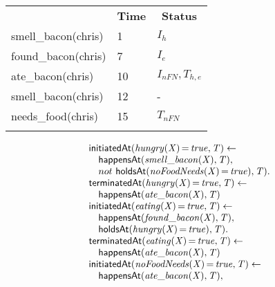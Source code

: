 \documentclass[8pt]{beamer}
\DeclareMathOperator{\val}{=}  %
\def \patsize {}
\def\happensAt{\textsf{\patsize happensAt}}
\def\holdsAt{\textsf{\patsize holdsAt}}
\def\initiatedAt{\textsf{\patsize initiatedAt}}
\def\terminatedAt{\textsf{\patsize terminatedAt}}
\newenvironment{mysplit}%
  {\arraycolsep 0pt \begin{array}{l}}%
  {\end{array}}
\begin{document}
\begin{frame}
\begin{minipage}{0.4\linewidth}
\begin{table}[t!]
\begin{center}
                \begin{tabular}{lll}
                    \hline\noalign{\smallskip}
                    \multicolumn{1}{l}{\textbf{Event}} & \multicolumn{1}{c}{\textbf{Time}} & \multicolumn{1}{c}{\textbf{Status}} \\
                    smell\_bacon(chris)& 1 & $I_{h}$\\
                    found\_bacon(chris)& 7 & $I_{e}$\\
                    ate\_bacon(chris)& 10  & $I_{nFN},T_{h,e}$\\
                    smell\_bacon(chris)& 12 & -\\
                    needs\_food(chris)& 15 & $T_{nFN}$\\
                    \noalign{\smallskip}
                    \hline
                \end{tabular}
            \end{center}
        \end{table}
    \end{minipage}
    \begin{minipage}{0.55\linewidth}
        \begin{align*}
            \begin{mysplit}
                \initiatedAt\mathit{(hungry(X)\val true,T)\leftarrow}\\
                \quad    \happensAt\mathit{(smell\_bacon(X),T),}\\
                \quad    not\ \holdsAt\mathit{(noFoodNeeds(X)\val true),T).}\\
                \terminatedAt\mathit{(hungry(X)\val true,T)\leftarrow}\\
                \quad    \happensAt\mathit{(ate\_bacon(X),T)}\\
                \initiatedAt\mathit{(eating(X)\val true,T)\leftarrow}\\
                \quad    \happensAt\mathit{(found\_bacon(X),T),}\\
                \quad    \holdsAt\mathit{(hungry(X)\val true),T).}\\
                \terminatedAt\mathit{(eating(X)\val true,T)\leftarrow}\\
                \quad    \happensAt\mathit{(ate\_bacon(X),T)}\\
                \initiatedAt\mathit{(noFoodNeeds(X)\val true,T)\leftarrow}\\
                \quad    \happensAt\mathit{(ate\_bacon(X),T),}\\

\end{mysplit}
\end{align*}
\end{minipage}
\end{frame}
\end{document}
